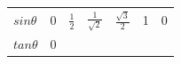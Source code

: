 {{\begin{center}
\begin{tabular}[t]{|l|l|l|l|l|l|l|}
                \begin{math}sin\theta \end{math}
               &
        0 &
                \begin{math}\frac{1}{2}\end{math}
               &
                \begin{math}\frac{1}{\sqrt{2}}\end{math}
               &
                \begin{math}\frac{\sqrt{3}}{2}\end{math}
               &
        1 &
        0%
     \tabularnewline\cline{1-1}\cline{2-2}\cline{3-3}\cline{4-4}\cline{5-5}\cline{6-6}\cline{7-7}
                \begin{math}tan\theta \end{math}
               &
        0 &

\end{tabular}
\end{center}}}
